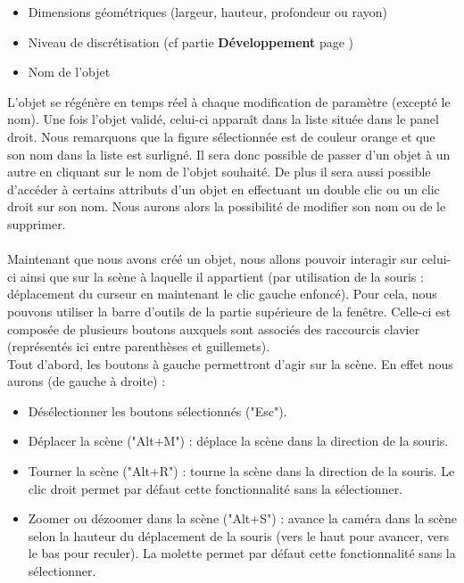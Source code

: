 \documentclass[a4paper]{memoir}
\begin{document}
			\begin{itemize}
				\item Dimensions géométriques (largeur, hauteur, profondeur ou rayon)
				\item Niveau de discrétisation (cf partie \textbf{Développement} page \pageref{mesh-dev})
				\item Nom de l'objet
			\end{itemize}
			L'objet se régénère en temps réel à chaque modification de paramètre (excepté le nom). Une fois l'objet validé, celui-ci apparaît dans la liste 
			située dans le panel droit. Nous remarquons que la figure sélectionnée est de couleur orange et que son nom dans la liste est surligné. Il sera 
			donc possible de passer d'un objet à un autre en cliquant sur le nom de l'objet souhaité. De plus il sera aussi possible d'accéder à certains 
			attributs d'un objet en effectuant un double clic ou un clic droit sur son nom. Nous aurons alors la possibilité de modifier son nom ou de le 
			supprimer.\\\\ 
			Maintenant que nous avons créé un objet, nous allons pouvoir interagir sur celui-ci ainsi que sur la scène à laquelle il appartient (par 
			utilisation de la souris : déplacement du curseur en maintenant le clic gauche enfoncé). Pour cela, nous pouvons utiliser la barre d'outils de 
			la partie supérieure de la fenêtre. Celle-ci est composée de plusieurs boutons auxquels sont associés des raccourcis clavier (représentés ici 
			entre parenthèses et guillemets).\\
			Tout d'abord, les boutons à gauche permettront d'agir sur la  scène. En effet nous aurons (de gauche à droite) : 
			\begin{itemize}
				\item Désélectionner les boutons sélectionnés ("Esc").
				\item Déplacer la scène ("Alt+M") : déplace la scène dans la direction de la souris.
				\item Tourner la scène ("Alt+R") : tourne la scène dans la direction de la souris. Le clic droit permet par défaut cette fonctionnalité sans 
				la sélectionner.
				\item Zoomer ou dézoomer dans la scène ("Alt+S") : avance la caméra dans la scène selon la hauteur du déplacement de la souris (vers le haut 
				pour avancer, vers le bas pour reculer). La molette permet par défaut cette fonctionnalité sans la sélectionner.
			\end{itemize}
\end{document}
